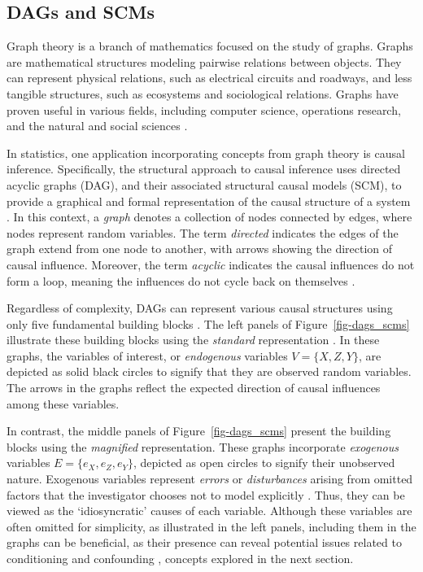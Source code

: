\documentclass[
  authoryear,
  preprint,
  1p]{elsarticle}
\begin{document}
\subsection{DAGs and SCMs}\label{sec-framework-dag}

Graph theory is a branch of mathematics focused on the study of graphs.
Graphs are mathematical structures modeling pairwise relations between
objects. They can represent physical relations, such as electrical
circuits and roadways, and less tangible structures, such as ecosystems
and sociological relations. Graphs have proven useful in various fields,
including computer science, operations research, and the natural and
social sciences \citep{Gross_et_al_2018}.

In statistics, one application incorporating concepts from graph theory
is causal inference. Specifically, the structural approach to causal
inference uses directed acyclic graphs (DAG), and their associated
structural causal models (SCM), to provide a graphical and formal
representation of the causal structure of a system \citep{Neal_2020}. In
this context, a \emph{graph} denotes a collection of nodes connected by
edges, where nodes represent random variables. The term \emph{directed}
indicates the edges of the graph extend from one node to another, with
arrows showing the direction of causal influence. Moreover, the term
\emph{acyclic} indicates the causal influences do not form a loop,
meaning the influences do not cycle back on themselves
\citep{McElreath_2020}.

Regardless of complexity, DAGs can represent various causal structures
using only five fundamental building blocks
\citep{Neal_2020, McElreath_2020}. The left panels of
Figure~\ref{fig-dags_scms} illustrate these building blocks using the
\emph{standard} representation \citep{Morgan_et_al_2014}. In these
graphs, the variables of interest, or \emph{endogenous} variables
\(V=\{X,Z,Y\}\), are depicted as solid black circles to signify that
they are observed random variables. The arrows in the graphs reflect the
expected direction of causal influences among these variables.

In contrast, the middle panels of Figure~\ref{fig-dags_scms} present the
building blocks using the \emph{magnified} representation. These graphs
incorporate \emph{exogenous} variables \(E=\{e_{X},e_{Z},e_{Y}\}\),
depicted as open circles to signify their unobserved nature. Exogenous
variables represent \emph{errors} or \emph{disturbances} arising from
omitted factors that the investigator chooses not to model explicitly
\citep[27,68]{Pearl_2009}. Thus, they can be viewed as the
`idiosyncratic' causes of each variable. Although these variables are
often omitted for simplicity, as illustrated in the left panels,
including them in the graphs can be beneficial, as their presence can
reveal potential issues related to conditioning and confounding
\citep{Cinelli_et_al_2020}, concepts explored in the next section.
\end{document}
